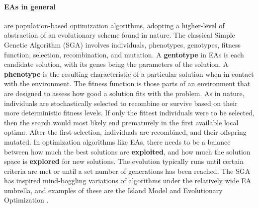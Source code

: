 \paragraph{EAs in general} are population-based optimization algorithms, adopting a higher-level of abstraction of an evolutionary scheme found in nature.
The classical Simple Genetic Algorithm (SGA) involves individuals, phenotypes, genotypes, fitness function, selection, recombination, and mutation.
A \textbf{gentotype} in EAs is each candidate solution, with its genes being the parameters of the solution. A \textbf{phenotype} is the resulting characteristic of a particular solution when in contact with the environment.
The fitness function is those parts of an environment that are designed to assess how good a solution fits with the problem.
As in nature, individuals are stochastically selected to recombine or survive based on their more deterministic fitness levels.
If only the fittest individuals were to be selected, then the search would most likely end prematurely in the first available local optima.
After the first selection, individuals are recombined, and their offspring mutated.
In optimization algorithms like EAs, there needs to be a balance between how much the best solutions are \textbf{exploited}, and how much the solution space is \textbf{explored} for new solutions.
The evolution typically runs until certain criteria are met or until a set number of generations has been reached.
\cite{eiben_introduction_2015}
The SGA has inspired mind-boggling variations of algorithms under the relatively wide EA umbrella, and examples of these are the
Island Model \cite{schuman_parallel_2016} and Evolutionary Optimization \cite{schuman_evolutionary_2016}.



